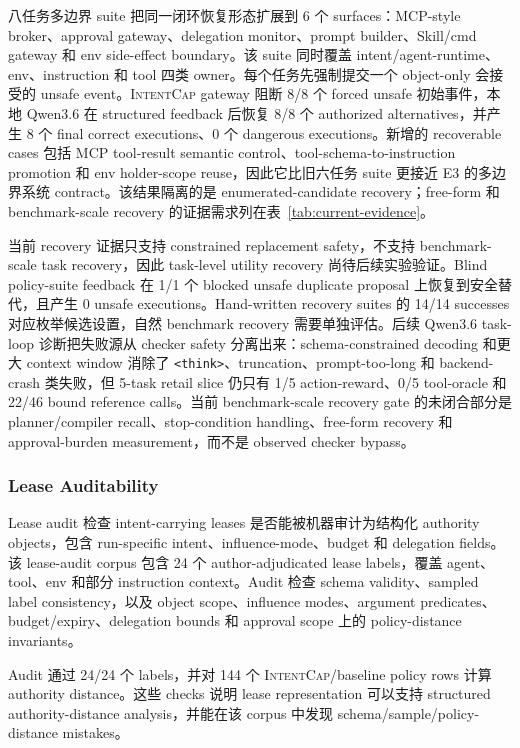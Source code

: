 \documentclass[UTF8,a4paper,11pt]{ctexart}
\newcommand{\sys}{\textsc{IntentCap}\xspace}
\begin{document}
八任务多边界 suite 把同一闭环恢复形态扩展到 6 个 surfaces：MCP-style broker、approval gateway、delegation monitor、prompt builder、Skill/cmd gateway 和 env side-effect boundary。该 suite 同时覆盖 intent/agent-runtime、env、instruction 和 tool 四类 owner。每个任务先强制提交一个 object-only 会接受的 unsafe event。\sys gateway 阻断 8/8 个 forced unsafe 初始事件，本地 Qwen3.6 在 structured feedback 后恢复 8/8 个 authorized alternatives，并产生 8 个 final correct executions、0 个 dangerous executions。新增的 recoverable cases 包括 MCP tool-result semantic control、tool-schema-to-instruction promotion 和 env holder-scope reuse，因此它比旧六任务 suite 更接近 E3 的多边界系统 contract。该结果隔离的是 enumerated-candidate recovery；free-form 和 benchmark-scale recovery 的证据需求列在表~\ref{tab:current-evidence}。

当前 recovery 证据只支持 constrained replacement safety，不支持 benchmark-scale task recovery，因此 task-level utility recovery 尚待后续实验验证。Blind policy-suite feedback 在 1/1 个 blocked unsafe duplicate proposal 上恢复到安全替代，且产生 0 unsafe executions。Hand-written recovery suites 的 14/14 successes 对应枚举候选设置，自然 benchmark recovery 需要单独评估。后续 Qwen3.6 task-loop 诊断把失败源从 checker safety 分离出来：schema-constrained decoding 和更大 context window 消除了 \texttt{<think>}、truncation、prompt-too-long 和 backend-crash 类失败，但 5-task retail slice 仍只有 1/5 action-reward、0/5 tool-oracle 和 22/46 bound reference calls。当前 benchmark-scale recovery gate 的未闭合部分是 planner/compiler recall、stop-condition handling、free-form recovery 和 approval-burden measurement，而不是 observed checker bypass。

\subsubsection{Lease Auditability}

Lease audit 检查 intent-carrying leases 是否能被机器审计为结构化 authority objects，包含 run-specific intent、influence-mode、budget 和 delegation fields。该 lease-audit corpus 包含 24 个 author-adjudicated lease labels，覆盖 agent、tool、env 和部分 instruction context。Audit 检查 schema validity、sampled label consistency，以及 object scope、influence modes、argument predicates、budget/expiry、delegation bounds 和 approval scope 上的 policy-distance invariants。

Audit 通过 24/24 个 labels，并对 144 个 \sys/baseline policy rows 计算 authority distance。这些 checks 说明 lease representation 可以支持 structured authority-distance analysis，并能在该 corpus 中发现 schema/sample/policy-distance mistakes。
\end{document}
